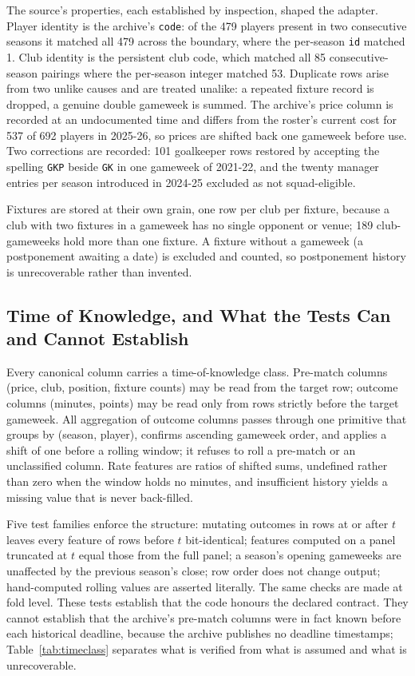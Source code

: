 \documentclass[11pt,a4paper]{article}
\begin{document}
The source's properties, each established by inspection, shaped the adapter. Player identity is the archive's \texttt{code}: of the 479 players present in two consecutive seasons it matched all 479 across the boundary, where the per-season \texttt{id} matched 1. Club identity is the persistent club code, which matched all 85 consecutive-season pairings where the per-season integer matched 53. Duplicate rows arise from two unlike causes and are treated unalike: a repeated fixture record is dropped, a genuine double gameweek is summed. The archive's price column is recorded at an undocumented time and differs from the roster's current cost for 537 of 692 players in 2025-26, so prices are shifted back one gameweek before use. Two corrections are recorded: 101 goalkeeper rows restored by accepting the spelling \texttt{GKP} beside \texttt{GK} in one gameweek of 2021-22, and the twenty manager entries per season introduced in 2024-25 excluded as not squad-eligible.

Fixtures are stored at their own grain, one row per club per fixture, because a club with two fixtures in a gameweek has no single opponent or venue; 189 club-gameweeks hold more than one fixture. A fixture without a gameweek (a postponement awaiting a date) is excluded and counted, so postponement history is unrecoverable rather than invented.

\subsection{Time of Knowledge, and What the Tests Can and Cannot Establish}

Every canonical column carries a time-of-knowledge class. Pre-match columns (price, club, position, fixture counts) may be read from the target row; outcome columns (minutes, points) may be read only from rows strictly before the target gameweek. All aggregation of outcome columns passes through one primitive that groups by (season, player), confirms ascending gameweek order, and applies a shift of one before a rolling window; it refuses to roll a pre-match or an unclassified column. Rate features are ratios of shifted sums, undefined rather than zero when the window holds no minutes, and insufficient history yields a missing value that is never back-filled.

Five test families enforce the structure: mutating outcomes in rows at or after $t$ leaves every feature of rows before $t$ bit-identical; features computed on a panel truncated at $t$ equal those from the full panel; a season's opening gameweeks are unaffected by the previous season's close; row order does not change output; hand-computed rolling values are asserted literally. The same checks are made at fold level. These tests establish that the code honours the declared contract. They cannot establish that the archive's pre-match columns were in fact known before each historical deadline, because the archive publishes no deadline timestamps; Table~\ref{tab:timeclass} separates what is verified from what is assumed and what is unrecoverable.
\end{document}
